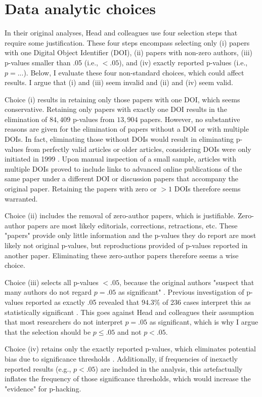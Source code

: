\section*{Data analytic choices}
In their original analyses, Head and colleagues use four selection steps that require some justification. These four steps encompass selecting only (i) papers with one Digital Object Identifier (DOI), (ii) papers with non-zero authors, (iii) p-values smaller than .05 (i.e., $<.05$), and (iv) exactly reported p-values (i.e., $p=...$). Below, I evaluate these four non-standard choices, which could affect results. I argue that (i) and (iii) seem invalid and (ii) and (iv) seem valid.

Choice (i) results in retaining only those papers with one DOI, which seems conservative. Retaining only papers with exactly one DOI results in the elimination of $84,409$ p-values from $13,904$ papers. However, no substantive reasons are given for the elimination of papers without a DOI or with multiple DOIs. In fact, eliminating those without DOIs would result in eliminating p-values from perfectly valid articles or older articles, considering DOIs were only initiated in 1999 \cite{Crossre2009}. Upon manual inspection of a small sample, articles with multiple DOIs proved to include links to advanced online publications of the same paper under a different DOI or discussion papers that accompany the original paper. Retaining the papers with zero or $>1$ DOIs therefore seems warranted.

Choice (ii) includes the removal of zero-author papers, which is justifiable. Zero-author papers are most likely editorials, corrections, retractions, etc. These "papers" provide only little information and the p-values they do report are most likely not original p-values, but reproductions provided of p-values reported in another paper. Eliminating these zero-author papers therefore seems a wise choice.

Choice (iii) selects all p-values $<.05$, because the original authors "suspect that many authors do not regard $p=.05$ as significant" \cite{Head2015}. Previous investigation of p-values reported as exactly .05 revealed that $94.3\%$ of 236 cases interpret this as statistically significant \cite{Nuijten2015}. This goes against Head and colleagues their assumption that most researchers do not interpret $p=.05$ as significant, which is why I argue that the selection should be $p\leq.05$ and not $p<.05$.

Choice (iv) retains only the exactly reported p-values, which eliminates potential bias due to significance thresholds \cite{Ridley2007}. Additionally, if frequencies of inexactly reported results (e.g., $p<.05$) are included in the analysis, this artefactually inflates the frequency of those significance thresholds, which would increase the "evidence" for p-hacking. 